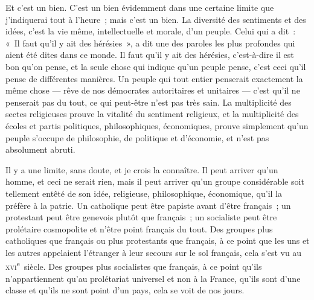 \documentclass[french,twoside]{book} %
\begin{document}
Et c’est un bien. C’est un bien évidemment dans une certaine limite que j’indiquerai tout à l’heure ; mais c’est un bien. La diversité des sentiments et  des idées, c’est la vie même, intellectuelle et morale, d’un peuple. Celui qui a dit : « Il faut qu’il y ait des hérésies », a dit une des paroles les plus profondes qui aient été dites dans ce monde. Il faut qu’il y ait des hérésies, c’est-à-dire il est bon qu’on pense, et la seule chose qui indique qu’un peuple pense, c’est ceci qu’il pense de différentes manières. Un peuple qui tout entier penserait exactement la même chose — rêve de nos démocrates autoritaires et unitaires — c’est qu’il ne penserait pas du tout, ce qui peut-être n’est pas très sain. La multiplicité des sectes religieuses prouve la vitalité du sentiment religieux, et la multiplicité des écoles et partis politiques, philosophiques, économiques, prouve simplement qu’un peuple s’occupe de philosophie, de politique et d’économie, et n’est pas absolument abruti.\par
Il y a une limite, sans doute, et je crois la connaître. Il peut arriver qu’un homme, et ceci ne serait rien, mais il peut arriver qu’un groupe considérable soit tellement entêté de son idée, religieuse, philosophique, économique, qu’il la préfère à la patrie. Un catholique peut être papiste avant d’être français ; un protestant peut être genevois plutôt que français ; un socialiste peut être prolétaire cosmopolite et n’être point français du tout. Des groupes plus catholiques que français ou plus  protestants que français, à ce point que les uns et les autres appelaient l’étranger à leur secours sur le sol français, cela s’est vu au \textsc{xvi}\textsuperscript{e} siècle. Des groupes plus socialistes que français, à ce point qu’ils n’appartiennent qu’au prolétariat universel et non à la France, qu’ils sont d’une classe et qu’ils ne sont point d’un pays, cela se voit de nos jours.\par
\end{document}
